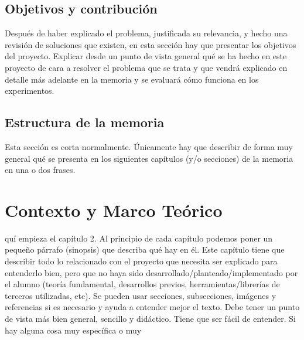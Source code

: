 \documentclass[a4paper,11pt,reqno,twoside]{memoir}
\begin{document}
\section{Objetivos y contribución}
\label{sec:objetivos_contribucion}

Después de haber explicado el problema, justificada su relevancia, y hecho una revisión de soluciones que existen, en esta sección hay que presentar los objetivos del proyecto. Explicar desde un punto de vista general qué se ha hecho en este proyecto de cara a resolver el problema que se trata y que vendrá explicado en detalle más adelante en la memoria y se evaluará cómo funciona en los experimentos.

\section{Estructura de la memoria}
\label{sec:estructura_memoria}

Esta sección es corta normalmente. Únicamente hay que describir de forma muy general qué se presenta en los siguientes capítulos (y/o secciones) de la memoria en una o dos frases.

\clearemptydoublepage
\chapter{Contexto y Marco Teórico}
\label{sec:contexto_marco_teorico}
\minitoc
\vspace{1cm}
quí empieza el capítulo 2. Al principio de cada capítulo podemos poner un pequeño párrafo (sinopsis) que describa qué hay en él. Este capítulo tiene que describir todo lo relacionado con el proyecto que necesita ser explicado para entenderlo bien, pero que no haya sido desarrollado/planteado/implementado por el alumno (teoría fundamental, desarrollos previos, herramientas/librerías de terceros utilizadas, etc). Se pueden usar secciones, subsecciones, imágenes y referencias si es necesario y ayuda a entender mejor el texto. Debe tener un punto de vista más bien general, sencillo y didáctico. Tiene que ser fácil de entender. Si hay alguna cosa muy específica o muy 
\newpage

\clearemptydoublepage
\end{document}
